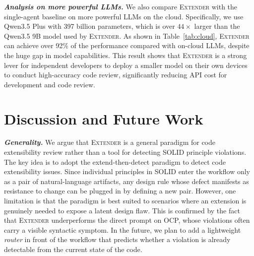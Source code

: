 \documentclass[sigconf,screen]{acmart}
\newcommand{\tool}{\textsc{Extender}\xspace}
\begin{document}
\noindent
\textbf{\textit{Analysis on more powerful LLMs.}}
We also compare \tool with the single-agent baseline on more powerful LLMs on the cloud.
Specifically, we use Qwen3.5 Plus with 397 billion parameters, which is over $44\times$ larger than the Qwen3.5 9B model used by \tool.
As shown in Table~\ref{tab:cloud}, \tool can achieve over 92\% of the performance compared with on-cloud LLMs, despite the huge gap in model capabilities.
This result shows that \tool is a strong lever for independent developers to deploy a smaller model on their own devices to conduct high-accuracy code review, significantly reducing API cost for development and code review.




\section{Discussion and Future Work}\label{sec:discussion}

\textbf{\textit{Generality.}}
We argue that \tool is a general paradigm for code extensibility review rather than a tool for detecting SOLID principle violations.
The key idea is to adopt the extend-then-detect paradigm to detect code extensibility issues.
Since individual principles in SOLID enter the workflow only as a pair of natural-language artifacts, any design rule whose defect manifests as resistance to change can be plugged in by defining a new pair. However, one limitation is that the paradigm is best suited to scenarios where an extension is genuinely needed to expose a latent design flaw.
This is confirmed by the fact that \tool underperforms the direct prompt on OCP, whose violations often carry a visible syntactic symptom.
In the future, we plan to add a lightweight \textit{router} in front of the workflow that predicts whether a violation is already detectable from the current state of the code.
\end{document}
